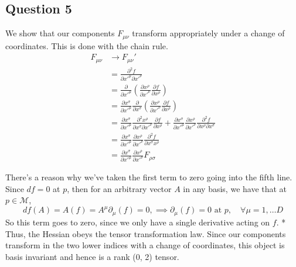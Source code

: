 \documentclass[11pt, a4paper]{article}   	%
\theoremstyle{slplain}
\begin{document}
\subsection{Question 5} 
We show that our components $F_{\mu \nu}$ transform appropriately under a change of coordinates. This is done with the chain rule. 
\begin{align*} 
F_{ \mu \nu} & \rightarrow F_{ \mu \nu}' \\
&= \frac{ \partial^2 f}{ \partial x'^\mu \partial x'^\nu} \\
&= \frac{ \partial}{ \partial x '^\mu } \left( \frac{ \partial x^\rho }{ \partial x'^\nu } \frac{ \partial f }{ \partial x^\rho } \right) \\
&= \frac{ \partial x^\sigma}{ \partial x'^\mu } \frac{ \partial }{ \partial x^\sigma} \left( \frac{ \partial x^\rho}{ \partial x'^\nu} \frac{ \partial f}{ \partial x^\rho } \right) \\
&= \frac{ \partial x^\sigma}{ \partial x'^\mu} \frac{ \partial^2 x^\rho}{ \partial x^\sigma \partial x'^\nu } \frac{ \partial f }{ \partial x^\rho} + \frac{ \partial x^\sigma }{ \partial x'^\mu }\frac{\partial x^\rho}{\partial x'^\nu}\frac{\partial^2 f}{ \partial x^\rho \partial x^\sigma } \\
&= \frac{ \partial x^\sigma}{ \partial x'^\mu } \frac{ \partial x^\rho}{ \partial x'^\nu } \frac{ \partial^2 f }{ \partial x^\sigma x^\rho } \\
& =   \frac{ \partial x^\sigma}{ \partial x'^\mu } \frac{ \partial x^\rho}{ \partial x'^\nu } F_{\rho \sigma} 
\end{align*} 

There's a reason why we've taken the first term to zero going into the fifth line. 
Since $ df = 0 $ at $ p$,  then for an arbitrary vector $ A$ in any basis, we
have that at $ p \in \mathcal{ M } $,  
\[
df ( A) = A( f) = A^{\mu } \partial_\mu ( f) = 0, \implies \partial_\mu ( f) = 0 \text{ at } p, \quad \forall \mu = 1, \dots D
\] 
So this term goes to zero, since we only have a single derivative acting on $ f $. *
Thus, the Hessian obeys the tensor transformation law. Since our components transform in the two lower indices with a change of coordinates, this object is basis invariant and hence is a rank (0, 2) tensor. 
\end{document}
